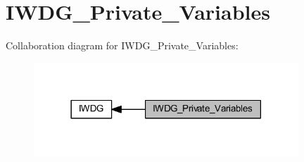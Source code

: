 \hypertarget{group___i_w_d_g___private___variables}{}\section{I\+W\+D\+G\+\_\+\+Private\+\_\+\+Variables}
\label{group___i_w_d_g___private___variables}
Collaboration diagram for I\+W\+D\+G\+\_\+\+Private\+\_\+\+Variables\+:
\nopagebreak
\begin{figure}[H]
\begin{center}
\leavevmode
\includegraphics[width=282pt]{group___i_w_d_g___private___variables}
\end{center}
\end{figure}
